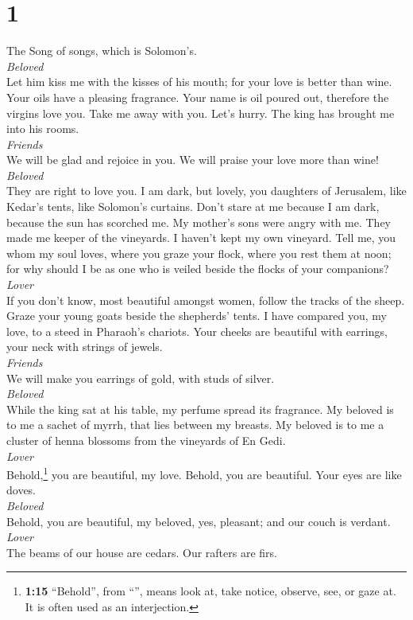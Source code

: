 \hypertarget{section}{%
\section{1}\label{section}}

 The Song of songs, which is Solomon's.\\
\emph{Beloved}\\
 Let him kiss me with the kisses of his mouth; for your
love is better than wine.  Your oils have a pleasing
fragrance. Your name is oil poured out, therefore the virgins love you.
 Take me away with you. Let's hurry. The king has brought
me into his rooms.\\
\emph{Friends}\\
We will be glad and rejoice in you. We will praise your love more than
wine!\\
\emph{Beloved}\\
They are right to love you.  I am dark, but lovely, you
daughters of Jerusalem, like Kedar's tents, like Solomon's curtains.
 Don't stare at me because I am dark, because the sun has
scorched me. My mother's sons were angry with me. They made me keeper of
the vineyards. I haven't kept my own vineyard.  Tell me,
you whom my soul loves, where you graze your flock, where you rest them
at noon; for why should I be as one who is veiled beside the flocks of
your companions?\\
\emph{Lover}\\
 If you don't know, most beautiful amongst women, follow
the tracks of the sheep. Graze your young goats beside the shepherds'
tents.  I have compared you, my love, to a steed in
Pharaoh's chariots.  Your cheeks are beautiful with
earrings, your neck with strings of jewels.\\
\emph{Friends}\\
 We will make you earrings of gold, with studs of
silver.\\
\emph{Beloved}\\
 While the king sat at his table, my perfume spread its
fragrance.  My beloved is to me a sachet of myrrh, that
lies between my breasts.  My beloved is to me a cluster
of henna blossoms from the vineyards of En Gedi.\\
\emph{Lover}\\
 Behold,\footnote{\textbf{1:15} ``Behold'', from
  ``'', means look at, take notice, observe, see, or gaze
  at. It is often used as an interjection.} you are beautiful, my love.
Behold, you are beautiful. Your eyes are like doves.\\
\emph{Beloved}\\
 Behold, you are beautiful, my beloved, yes, pleasant;
and our couch is verdant.\\
\emph{Lover}\\
 The beams of our house are cedars. Our rafters are firs.


